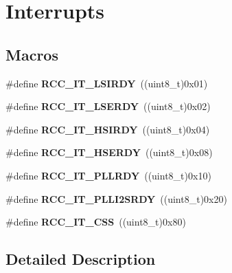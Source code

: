 \hypertarget{group___r_c_c___interrupt}{}\section{Interrupts}
\label{group___r_c_c___interrupt}
\subsection*{Macros}
\begin{DoxyCompactItemize}
\item 
\mbox{\label{group___r_c_c___interrupt_ga2b4ef277c1b71f96e0bef4b9a72fca94}} 
\#define {\bfseries R\+C\+C\+\_\+\+I\+T\+\_\+\+L\+S\+I\+R\+DY}~((uint8\+\_\+t)0x01)
\item 
\mbox{\label{group___r_c_c___interrupt_gad6b6e78a426850f595ef180d292a673d}} 
\#define {\bfseries R\+C\+C\+\_\+\+I\+T\+\_\+\+L\+S\+E\+R\+DY}~((uint8\+\_\+t)0x02)
\item 
\mbox{\label{group___r_c_c___interrupt_ga69637e51b71f73f519c8c0a0613d042f}} 
\#define {\bfseries R\+C\+C\+\_\+\+I\+T\+\_\+\+H\+S\+I\+R\+DY}~((uint8\+\_\+t)0x04)
\item 
\mbox{\label{group___r_c_c___interrupt_gad13eaede352bca59611e6cae68665866}} 
\#define {\bfseries R\+C\+C\+\_\+\+I\+T\+\_\+\+H\+S\+E\+R\+DY}~((uint8\+\_\+t)0x08)
\item 
\mbox{\label{group___r_c_c___interrupt_ga68d48e7811fb58f2649dce6cf0d823d9}} 
\#define {\bfseries R\+C\+C\+\_\+\+I\+T\+\_\+\+P\+L\+L\+R\+DY}~((uint8\+\_\+t)0x10)
\item 
\mbox{\label{group___r_c_c___interrupt_ga6468ff3bad854272cf1120ffbf69b7ac}} 
\#define {\bfseries R\+C\+C\+\_\+\+I\+T\+\_\+\+P\+L\+L\+I2\+S\+R\+DY}~((uint8\+\_\+t)0x20)
\item 
\mbox{\label{group___r_c_c___interrupt_ga9bb34a4912d2084dc1c0834eb53aa7a3}} 
\#define {\bfseries R\+C\+C\+\_\+\+I\+T\+\_\+\+C\+SS}~((uint8\+\_\+t)0x80)
\end{DoxyCompactItemize}


\subsection{Detailed Description}

